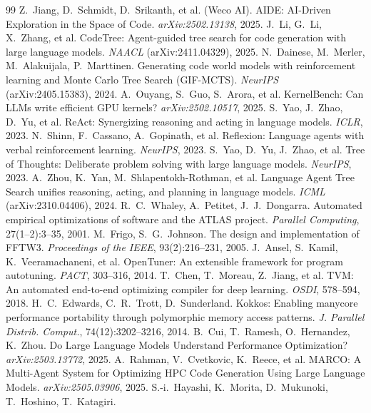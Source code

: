 \documentclass[conference,letterpaper]{IEEEtran}
\begin{document}
\begin{thebibliography}{99}
 Z.~Jiang, D.~Schmidt, D.~Srikanth, et al. (Weco AI).
  AIDE: AI-Driven Exploration in the Space of Code. \textit{arXiv:2502.13138}, 2025.
 J.~Li, G.~Li, X.~Zhang, et al.
  CodeTree: Agent-guided tree search for code generation with large language models.
  \textit{NAACL} (arXiv:2411.04329), 2025.
 N.~Dainese, M.~Merler, M.~Alakuijala, P.~Marttinen.
  Generating code world models with reinforcement learning and Monte Carlo Tree Search (GIF-MCTS).
  \textit{NeurIPS} (arXiv:2405.15383), 2024.
 A.~Ouyang, S.~Guo, S.~Arora, et al.
  KernelBench: Can LLMs write efficient GPU kernels? \textit{arXiv:2502.10517}, 2025.
 S.~Yao, J.~Zhao, D.~Yu, et al.
  ReAct: Synergizing reasoning and acting in language models. \textit{ICLR}, 2023.
 N.~Shinn, F.~Cassano, A.~Gopinath, et al.
  Reflexion: Language agents with verbal reinforcement learning. \textit{NeurIPS}, 2023.
 S.~Yao, D.~Yu, J.~Zhao, et al.
  Tree of Thoughts: Deliberate problem solving with large language models. \textit{NeurIPS}, 2023.
 A.~Zhou, K.~Yan, M.~Shlapentokh-Rothman, et al.
  Language Agent Tree Search unifies reasoning, acting, and planning in language models.
  \textit{ICML} (arXiv:2310.04406), 2024.
 R.~C.~Whaley, A.~Petitet, J.~J.~Dongarra.
  Automated empirical optimizations of software and the ATLAS project.
  \textit{Parallel Computing}, 27(1--2):3--35, 2001.
 M.~Frigo, S.~G.~Johnson.
  The design and implementation of FFTW3.
  \textit{Proceedings of the IEEE}, 93(2):216--231, 2005.
 J.~Ansel, S.~Kamil, K.~Veeramachaneni, et al.
  OpenTuner: An extensible framework for program autotuning.
  \textit{PACT}, 303--316, 2014.
 T.~Chen, T.~Moreau, Z.~Jiang, et al.
  TVM: An automated end-to-end optimizing compiler for deep learning.
  \textit{OSDI}, 578--594, 2018.
 H.~C.~Edwards, C.~R.~Trott, D.~Sunderland.
  Kokkos: Enabling manycore performance portability through polymorphic memory access patterns.
  \textit{J. Parallel Distrib. Comput.}, 74(12):3202--3216, 2014.
 B.~Cui, T.~Ramesh, O.~Hernandez, K.~Zhou.
  Do Large Language Models Understand Performance Optimization?
  \textit{arXiv:2503.13772}, 2025.
 A.~Rahman, V.~Cvetkovic, K.~Reece, et al.
  MARCO: A Multi-Agent System for Optimizing HPC Code Generation Using Large Language Models.
  \textit{arXiv:2505.03906}, 2025.
 S.-i.~Hayashi, K.~Morita, D.~Mukunoki, T.~Hoshino, T.~Katagiri.

\end{thebibliography}
\end{document}
